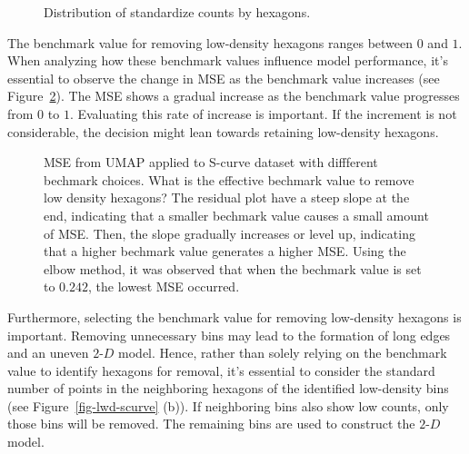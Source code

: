 \documentclass[
  12pt]{article}
\newcommand\gD{$2\text{-}D$}
\begin{document}
\begin{figure}[H]


\caption{\label{fig-stdcts-scurve}Distribution of standardize counts by
hexagons.}

\end{figure}%

The benchmark value for removing low-density hexagons ranges between
\(0\) and \(1\). When analyzing how these benchmark values influence
model performance, it's essential to observe the change in MSE as the
benchmark value increases (see Figure~\ref{fig-mse-scurve-lwd}). The MSE
shows a gradual increase as the benchmark value progresses from \(0\) to
\(1\). Evaluating this rate of increase is important. If the increment
is not considerable, the decision might lean towards retaining
low-density hexagons.

\begin{figure}[H]


\caption{\label{fig-mse-scurve-lwd}MSE from UMAP applied to S-curve
dataset with diffferent bechmark choices. What is the effective bechmark
value to remove low density hexagons? The residual plot have a steep
slope at the end, indicating that a smaller bechmark value causes a
small amount of MSE. Then, the slope gradually increases or level up,
indicating that a higher bechmark value generates a higher MSE. Using
the elbow method, it was observed that when the bechmark value is set to
\(0.242\), the lowest MSE occurred.}

\end{figure}%

Furthermore, selecting the benchmark value for removing low-density
hexagons is important. Removing unnecessary bins may lead to the
formation of long edges and an uneven \gD{} model. Hence, rather than
solely relying on the benchmark value to identify hexagons for removal,
it's essential to consider the standard number of points in the
neighboring hexagons of the identified low-density bins (see
Figure~\ref{fig-lwd-scurve} (b)). If neighboring bins also show low
counts, only those bins will be removed. The remaining bins are used to
construct the \gD{} model.
\end{document}
